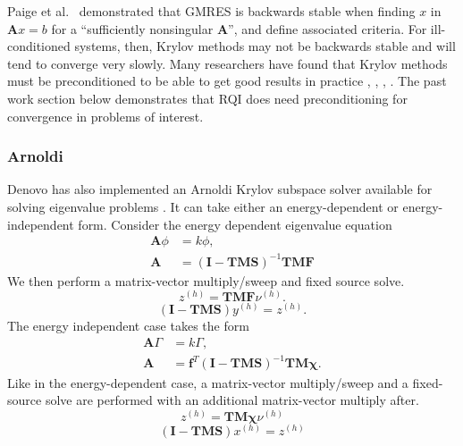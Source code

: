 \documentclass[preprint,12pt]{elsarticle}
\newcommand{\ve}[1]{\ensuremath{\mathbf{#1}}}
\begin{document}
Paige et al.\ \cite{Paige2006} demonstrated that GMRES is backwards stable when finding $x$ in $\ve{A}x = b$ for a ``sufficiently nonsingular $\ve{A}$'', and define associated criteria. For ill-conditioned systems, then, Krylov methods may not be backwards stable and will tend to converge very slowly. Many researchers have found that Krylov methods must be preconditioned to be able to get good results in practice \cite{Benzi2002}, \cite{Saad1986}, \cite{Trefethen1997} , \cite{Paige2006}. The past work section below demonstrates that RQI does need preconditioning for convergence in problems of interest.

\subsubsection{Arnoldi}
Denovo has also implemented an Arnoldi Krylov subspace solver available for solving eigenvalue problems \cite{Davidson2013}. 
It can take either an energy-dependent or energy-independent form. Consider the energy dependent eigenvalue equation 
\begin{equation}
\begin{split}
\mathbf{A}\phi &= k \phi, \\
\mathbf{A} &= (\mathbf{I} - \mathbf{TMS})^{-1}\mathbf{TMF}
\end{split}
\end{equation}
We then perform a matrix-vector multiply/sweep and fixed source solve.
\begin{equation}
z^{(h)} = \mathbf{TMF}\nu^{(h)}.
\end{equation}
\begin{equation}
(\mathbf{I} - \mathbf{TMS})y^{(h)} = z^{(h)}.
\end{equation}
The energy independent case takes the form
\begin{equation}
\begin{split}
\mathbf{A}\Gamma &= k\Gamma, \\
\mathbf{A} &= \mathbf{f}^T(\mathbf{I - TMS})^{-1}\mathbf{TM\chi}.
\end{split}
\end{equation}
Like in the energy-dependent case, a matrix-vector multiply/sweep and a fixed-source solve are performed with an additional matrix-vector multiply after.
\begin{equation}
z^{(h)} = \mathbf{TM\chi}\nu^{(h)}
\end{equation}
\begin{equation}
(\mathbf{I} - \mathbf{TMS})x^{(h)} = z^{(h)}
\end{equation}
\end{document}
